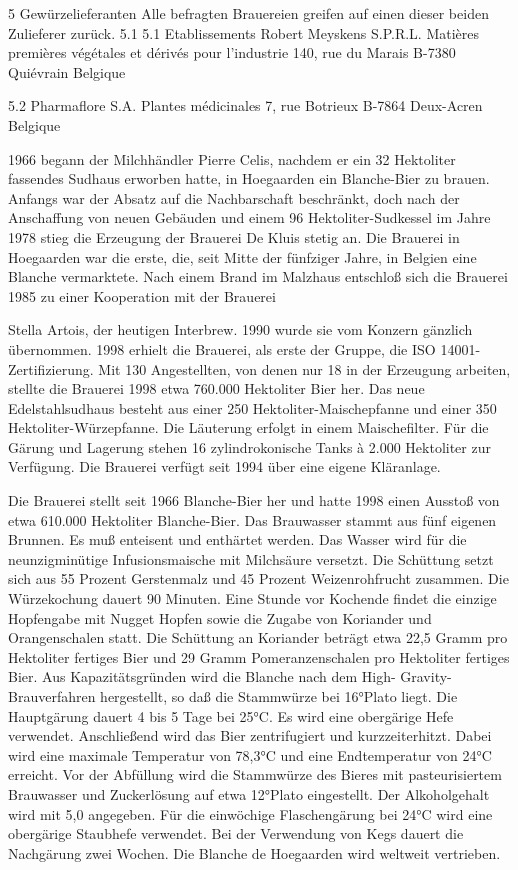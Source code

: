 \documentclass[a4paper,parskip=half]{scrartcl}
\begin{document}
\parencite[21]{Strottner1999}
5
Gewürzelieferanten
Alle befragten Brauereien greifen auf einen dieser beiden Zulieferer zurück.
5.1
5.1
Etablissements Robert Meyskens S.P.R.L.
Matières premières végétales et dérivés pour l'industrie
140, rue du Marais
B-7380 Quiévrain
Belgique

5.2
Pharmaflore S.A.
Plantes médicinales
7, rue Botrieux
B-7864 Deux-Acren
Belgique

\parencite[41]{Strottner1999}

1966 begann der Milchhändler Pierre Celis, nachdem er ein 32 Hektoliter fassendes
Sudhaus erworben hatte, in Hoegaarden ein Blanche-Bier zu brauen. Anfangs war
der Absatz auf die Nachbarschaft beschränkt, doch nach der Anschaffung von neuen
Gebäuden und einem 96 Hektoliter-Sudkessel im Jahre 1978 stieg die Erzeugung
der Brauerei De Kluis stetig an. Die Brauerei in Hoegaarden war die erste, die, seit
Mitte der fünfziger Jahre, in Belgien eine Blanche vermarktete. Nach einem Brand im
Malzhaus entschloß sich die Brauerei 1985 zu einer Kooperation mit der Brauerei

\parencite[42]{Strottner1999}

Stella Artois, der heutigen Interbrew. 1990 wurde sie vom Konzern gänzlich
übernommen.
1998
erhielt
die
Brauerei,
als
erste
der
Gruppe,
die
ISO 14001-Zertifizierung.
Mit 130 Angestellten, von denen nur 18 in der Erzeugung arbeiten, stellte die
Brauerei 1998 etwa 760.000 Hektoliter Bier her. Das neue Edelstahlsudhaus besteht
aus einer 250 Hektoliter-Maischepfanne und einer 350 Hektoliter-Würzepfanne. Die
Läuterung erfolgt in einem Maischefilter. Für die Gärung und Lagerung stehen
16 zylindrokonische Tanks à 2.000 Hektoliter zur Verfügung. Die Brauerei verfügt seit
1994 über eine eigene Kläranlage.

\parencite[43]{Strottner1999}

Die Brauerei stellt seit 1966 Blanche-Bier her und hatte 1998 einen Ausstoß von
etwa 610.000 Hektoliter Blanche-Bier.
Das Brauwasser stammt aus fünf eigenen Brunnen. Es muß enteisent und enthärtet
werden. Das Wasser wird für die neunzigminütige Infusionsmaische mit Milchsäure
versetzt. Die Schüttung setzt sich aus 55 Prozent Gerstenmalz und 45 Prozent
Weizenrohfrucht zusammen. Die Würzekochung dauert 90 Minuten. Eine Stunde vor
Kochende findet die einzige Hopfengabe mit Nugget Hopfen sowie die Zugabe von
Koriander und Orangenschalen statt. Die Schüttung an Koriander beträgt etwa
22,5 Gramm pro Hektoliter fertiges Bier und 29 Gramm Pomeranzenschalen pro
Hektoliter fertiges Bier. Aus Kapazitätsgründen wird die Blanche nach dem High-
Gravity-Brauverfahren hergestellt, so daß die Stammwürze bei 16°Plato liegt. Die
Hauptgärung dauert 4 bis 5 Tage bei 25°C. Es wird eine obergärige Hefe verwendet.
Anschließend wird das Bier zentrifugiert und kurzzeiterhitzt. Dabei wird eine
maximale Temperatur von 78,3°C und eine Endtemperatur von 24°C erreicht. Vor
der Abfüllung wird die Stammwürze des Bieres mit pasteurisiertem Brauwasser und
Zuckerlösung auf etwa 12°Plato eingestellt. Der Alkoholgehalt wird mit 5,0 %
angegeben. Für die einwöchige Flaschengärung bei 24°C wird eine obergärige
Staubhefe verwendet. Bei der Verwendung von Kegs dauert die Nachgärung zwei
Wochen. Die Blanche de Hoegaarden wird weltweit vertrieben.
\end{document}
